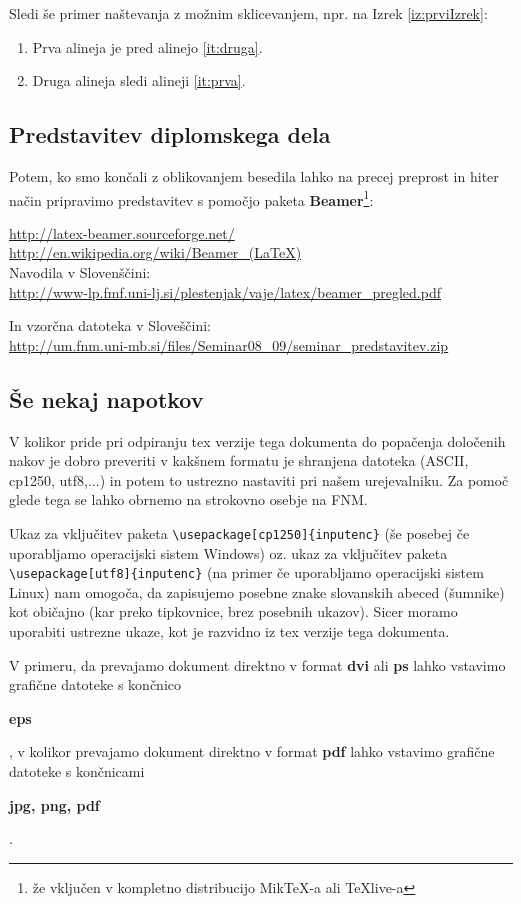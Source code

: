 Sledi \v se primer na\v stevanja z mo\v znim sklicevanjem, npr. na Izrek \ref{iz:prviIzrek}:
\begin{enumerate}[label=(\roman{*}), ref=(\roman{*})]
\item \label{it:prva} Prva alineja je pred alinejo \ref{it:druga}.
\item \label{it:druga} Druga alineja sledi alineji \ref{it:prva}.
\end{enumerate}

\subsection{Predstavitev diplomskega dela}

Potem, ko smo kon\v cali z oblikovanjem besedila lahko na precej
preprost in hiter na\v cin pripravimo predstavitev s pomo\v cjo paketa
{\bf Beamer}\footnote{\v ze vklju\v cen v kompletno distribucijo
  MikTeX-a ali TeXlive-a}:

\url{http://latex-beamer.sourceforge.net/}\\
\url{http://en.wikipedia.org/wiki/Beamer_(LaTeX)}\\

Navodila v Sloven\v s\v cini:\\
\url{http://www-lp.fmf.uni-lj.si/plestenjak/vaje/latex/beamer_pregled.pdf}

In vzor\v cna datoteka v Slove\v s\v cini:\\
\url{http://um.fnm.uni-mb.si/files/Seminar08_09/seminar_predstavitev.zip}

\subsection{\v Se nekaj napotkov}

V kolikor pride pri odpiranju tex verzije tega dokumenta do popa\v
cenja dolo\v cenih nakov je dobro preveriti v kak\v snem formatu je
shranjena datoteka (ASCII, cp1250, utf8,...) in potem to ustrezno
nastaviti pri na\v sem urejevalniku. Za pomo\v c glede tega se lahko
obrnemo na strokovno osebje na FNM.

Ukaz za vklju\v citev paketa \verb|\usepackage[cp1250]{inputenc}| (\v
se posebej \v ce uporabljamo operacijski sistem Windows) oz. ukaz za
vklju\v citev paketa \verb|\usepackage[utf8]{inputenc}| (na primer \v
ce uporabljamo operacijski sistem Linux) nam omogo\v ca, da zapisujemo
posebne znake slovanskih abeced (\v sumnike) kot obi\v cajno (kar
preko tipkovnice, brez posebnih ukazov). Sicer moramo uporabiti
ustrezne ukaze, kot je razvidno iz tex verzije tega dokumenta.

V primeru, da prevajamo dokument direktno v format {\bf dvi} ali {\bf
  ps} lahko vstavimo grafi\v cne datoteke s kon\v
cnico \begin{Large}{\bf eps}\end{Large}, v kolikor prevajamo dokument
direktno v format {\bf pdf} lahko vstavimo grafi\v cne datoteke s
kon\v cnicami \begin{Large}{\bf jpg, png, pdf}\end{Large}.




